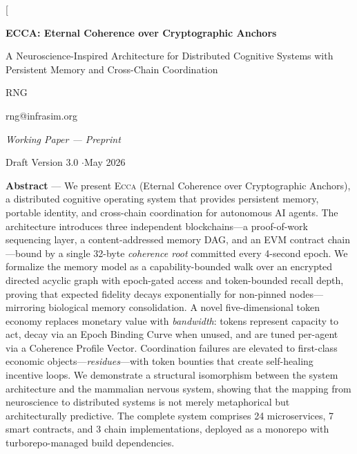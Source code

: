 \documentclass[11pt,twocolumn]{article}
\theoremstyle{definition}
\theoremstyle{plain}
\theoremstyle{remark}
\newcommand{\ecca}{\textsc{Ecca}}
\begin{document}
\twocolumn[
\begin{center}
  {\LARGE\bfseries\sffamily ECCA: Eternal Coherence over Cryptographic Anchors}\par\vspace{0.5em}
  {\large\sffamily A Neuroscience-Inspired Architecture for Distributed Cognitive
Systems with Persistent Memory and Cross-Chain Coordination}\par\vspace{1.5em}
  {\normalsize\sffamily RNG}\par\vspace{0.3em}
  {\small\ttfamily rng@infrasim.org}\par\vspace{1.5em}
  {\normalsize
    \textit{Working Paper --- Preprint}\par\vspace{0.3em}
    Draft Version 3.0 \quad$\cdot$\quad May 2026
  }\par\vspace{2em}
\end{center}

\begin{center}
\parbox{0.92\textwidth}{
\textbf{\sffamily Abstract} ---
We present \ecca{} (Eternal Coherence over Cryptographic Anchors), a distributed cognitive operating system that provides persistent memory, portable identity, and cross-chain coordination for autonomous AI agents. The architecture introduces three independent blockchains---a proof-of-work sequencing layer, a content-addressed memory DAG, and an EVM contract chain---bound by a single 32-byte \emph{coherence root} committed every 4-second epoch. We formalize the memory model as a capability-bounded walk over an encrypted directed acyclic graph with epoch-gated access and token-bounded recall depth, proving that expected fidelity decays exponentially for non-pinned nodes---mirroring biological memory consolidation. A novel five-dimensional token economy replaces monetary value with \emph{bandwidth}: tokens represent capacity to act, decay via an Epoch Binding Curve when unused, and are tuned per-agent via a Coherence Profile Vector. Coordination failures are elevated to first-class economic objects---\emph{residues}---with token bounties that create self-healing incentive loops. We demonstrate a structural isomorphism between the system architecture and the mammalian nervous system, showing that the mapping from neuroscience to distributed systems is not merely metaphorical but architecturally predictive. The complete system comprises 24 microservices, 7 smart contracts, and 3 chain implementations, deployed as a monorepo with turborepo-managed build dependencies.
}
\end{center}
\vspace{1.5em}
\end{document}
